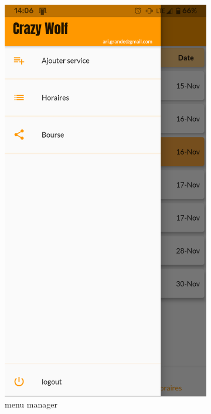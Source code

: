     \begin{figure}[!h]
        \centering
        \begin{subfigure}{.3\textwidth}
            \centering
            \includegraphics[width=0.9\linewidth]{screenshots/scenario_05/menu_manager.png}
            \caption{menu manager}
            \label{fig:menu_manager}
        \end{subfigure}
        \begin{subfigure}{.3\textwidth}
            \centering

\end{subfigure}
\end{figure}
